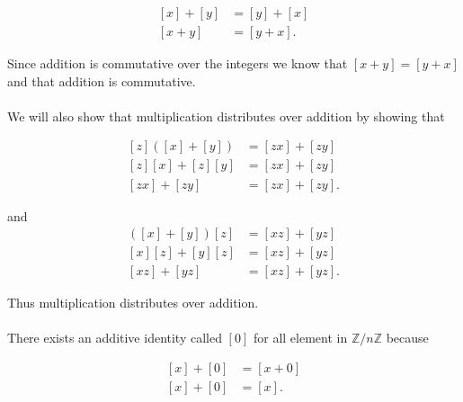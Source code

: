 \documentclass{article}
\begin{document}
        \begin{equation*}
          \begin{split}
            [x] + [y] &= [y] + [x]\\
            [x + y] &= [y+x].
          \end{split}
        \end{equation*}

        Since addition is commutative over the integers we know that $[x + y] = [y+x]$ and that addition is commutative.

        \paragraph{}
        We will also show that multiplication distributes over addition by showing that 

        \begin{equation*}
          \begin{split}
            [z]([x] + [y]) &= [zx] + [zy]\\
            [z][x] + [z][y] &= [zx] + [zy]\\
            [zx] + [zy] &= [zx] + [zy].
          \end{split}
        \end{equation*}

        and 
        \begin{equation*}
          \begin{split}
            ([x] + [y])[z] &= [xz] + [yz]\\
            [x][z] + [y][z] &= [xz] + [yz]\\
            [xz] + [yz] &= [xz] + [yz].
          \end{split}
        \end{equation*}

        Thus multiplication distributes over addition.

        \paragraph{}
        There exists an additive identity called $[0]$ for all element in $\mathbb{Z}/n\mathbb{Z}$ because

        \begin{equation*}
          \begin{split}
            [x] + [0] &= [x + 0]\\
            [x] + [0]&= [x].
          \end{split}
        \end{equation*}
\end{document}
